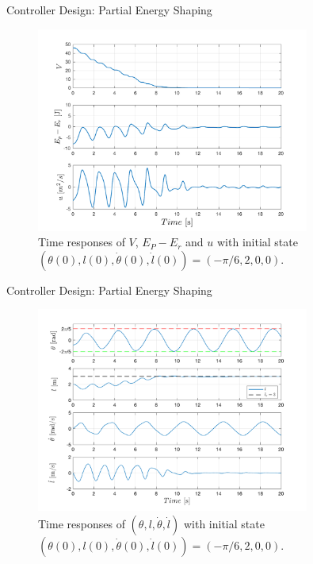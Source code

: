 \documentclass[10pt]{beamer}
\begin{document}
  \begin{frame}{Controller Design: Partial Energy Shaping}
    \begin{figure}
      \caption{Time responses of $V$, $E_P-E_r$ and $u$ with initial state 
        $(\theta(0), l(0), \dot{\theta}(0), \dot{l}(0))=(-\pi/6, 2, 0, 0).$}
      \vspace{-0.3cm}
      \includegraphics[width=0.8\textwidth]{images/partial_1.pdf}
    \end{figure}
  \end{frame}

  \begin{frame}{Controller Design: Partial Energy Shaping}
    \begin{figure}
      \caption{Time responses of $(\theta, l, \dot{\theta}, \dot{l})$ with 
        initial state $(\theta(0), l(0), \dot{\theta}(0), \dot{l}(0))=
        (-\pi/6, 2, 0, 0).$}
      \vspace{-0.3cm}
      \includegraphics[width=0.8\textwidth]{images/partial_2.pdf}
    \end{figure}
  \end{frame}
\end{document}
